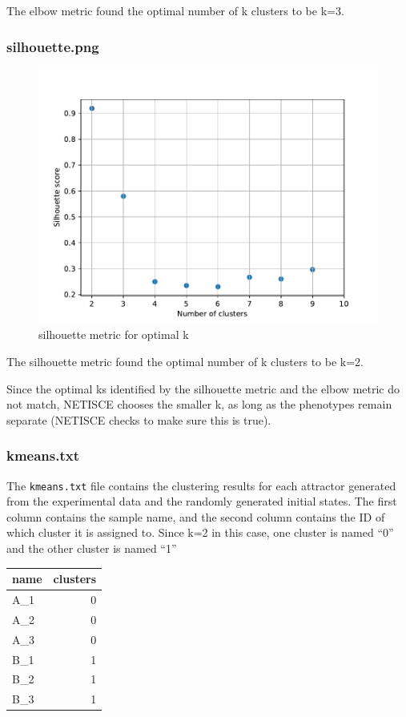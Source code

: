 \documentclass[
]{book}
\begin{document}
The elbow metric found the optimal number of k clusters to be k=3.

\hypertarget{section-id}{%
\subsubsection*{silhouette.png}\label{section-id}}

\begin{figure}

{\centering \includegraphics[width=0.5\linewidth]{results/silhouette} 

}

\caption{silhouette metric for optimal k}\label{fig:unnamed-chunk-12}
\end{figure}

The silhouette metric found the optimal number of k clusters to be k=2.

Since the optimal ks identified by the silhouette metric and the elbow metric do not match, NETISCE chooses the smaller k, as long as the phenotypes remain separate (NETISCE checks to make sure this is true).

\hypertarget{section-id}{%
\subsubsection*{kmeans.txt}\label{section-id}}

The \texttt{kmeans.txt} file contains the clustering results for each attractor generated from the experimental data and the randomly generated initial states. The first column contains the sample name, and the second column contains the ID of which cluster it is assigned to. Since k=2 in this case, one cluster is named
``0'' and the other cluster is named ``1''

\begin{tabular}{l|r}
\hline
name & clusters\\
\hline
A\_1 & 0\\
\hline
A\_2 & 0\\
\hline
A\_3 & 0\\
\hline
B\_1 & 1\\
\hline
B\_2 & 1\\
\hline
B\_3 & 1\\
\hline
\end{tabular}
\end{document}
